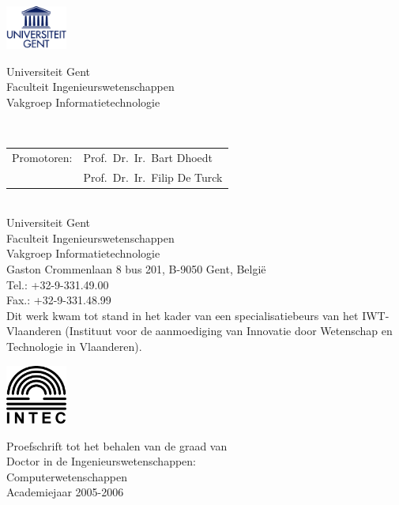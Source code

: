 \documentclass[10pt,a4paper,twoside,dutch,english]{book}                %
\begin{document}

\clearpage{\pagestyle{empty}\cleardoublepage}
\thispagestyle{empty}

\normalsize

\noindent
\begin{minipage}{3cm}%
  \includegraphics*[width=2cm]{UGentlogo}%
\end{minipage}\hfill
\begin{minipage}{8cm}
  \raggedleft
  \textsf{Universiteit Gent\\
    Faculteit Ingenieurswetenschappen\\
    Vakgroep Informatietechnologie}
\end{minipage}
\\[2cm]

\noindent \begin{tabular}{ @{} l l}
  Promotoren: & Prof.\ Dr.\ Ir.\ Bart Dhoedt    \\
              & Prof.\ Dr.\ Ir.\ Filip De Turck \\
\end{tabular}
\\[2cm]

\noindent Universiteit Gent \\
\noindent Faculteit Ingenieurswetenschappen
\\[0.3cm]
\noindent Vakgroep Informatietechnologie \\
\noindent Gaston Crommenlaan 8 bus 201,
\noindent B-9050 Gent, Belgi\"e
\\[0.3cm]
\noindent Tel.: +32-9-331.49.00\\
\noindent Fax.: +32-9-331.48.99
\\[4cm]
\noindent Dit werk kwam tot stand in het kader van een specialisatiebeurs van het IWT-Vlaanderen (Instituut voor de aanmoediging van Innovatie door Wetenschap en Technologie in Vlaanderen).

\vfill

\begin{minipage}{2.0cm}%
  \includegraphics*[width=2.0cm]{intec}%
\end{minipage}\hfill
\begin{minipage}{9cm}
  \raggedleft
  \textsf{Proefschrift tot het behalen van de graad van \\
    Doctor in de Ingenieurswetenschappen: \\
    Computerwetenschappen \\
    Academiejaar 2005-2006}
\end{minipage}
\clearpage{\pagestyle{empty}\cleardoublepage}
\end{document}
